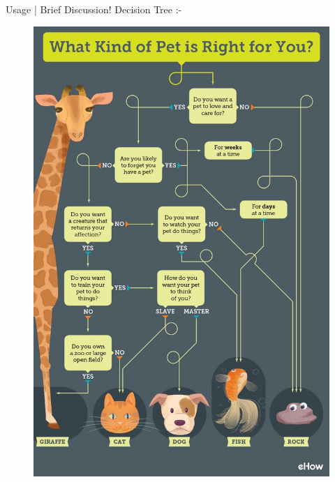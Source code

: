 \documentclass[10pt]{beamer}
\begin{document}
	\begin{frame}{Usage | Brief Discussion!}
		\large{Decision Tree :-}\\
		\begin{figure}
			\centering
			\includegraphics[scale=0.2]{images/barun_4}
			
		\end{figure}
	\end{frame}
\end{document}

